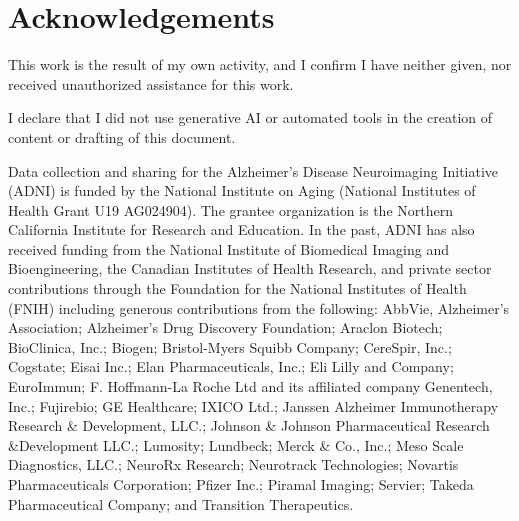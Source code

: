 \documentclass[a4paper, 12pt]{article}
\begin{document}





\newpage
\section{Acknowledgements}

This work is the result of my own activity, and I confirm I have neither given, nor received unauthorized assistance for this work.

I declare that I did not use generative AI or automated tools in the creation of content or drafting of this document.


Data collection and sharing for the Alzheimer's Disease Neuroimaging Initiative (ADNI) is funded by the National
Institute on Aging (National Institutes of Health Grant U19 AG024904). The grantee organization is the Northern
California Institute for Research and Education. In the past, ADNI has also received funding from the National
Institute of Biomedical Imaging and Bioengineering, the Canadian Institutes of Health Research, and private
sector contributions through the Foundation for the National Institutes of Health (FNIH) including generous
contributions from the following: AbbVie, Alzheimer’s Association; Alzheimer’s Drug Discovery Foundation;
Araclon Biotech; BioClinica, Inc.; Biogen; Bristol-Myers Squibb Company; CereSpir, Inc.; Cogstate; Eisai Inc.;
Elan Pharmaceuticals, Inc.; Eli Lilly and Company; EuroImmun; F. Hoffmann-La Roche Ltd and its affiliated
company Genentech, Inc.; Fujirebio; GE Healthcare; IXICO Ltd.; Janssen Alzheimer Immunotherapy Research \&
Development, LLC.; Johnson \& Johnson Pharmaceutical Research \&Development LLC.; Lumosity; Lundbeck;
Merck \& Co., Inc.; Meso Scale Diagnostics, LLC.; NeuroRx Research; Neurotrack Technologies; Novartis
Pharmaceuticals Corporation; Pfizer Inc.; Piramal Imaging; Servier; Takeda Pharmaceutical Company; and
Transition Therapeutics.
\newpage



\end{document}
